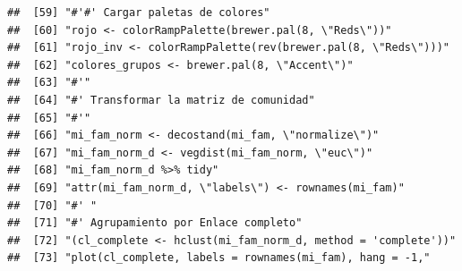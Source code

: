 \documentclass[11pt,]{article}
\begin{document}
\begin{verbatim}
##  [59] "#'#' Cargar paletas de colores"                                                                                                                                        
##  [60] "rojo <- colorRampPalette(brewer.pal(8, \"Reds\"))"                                                                                                                     
##  [61] "rojo_inv <- colorRampPalette(rev(brewer.pal(8, \"Reds\")))"                                                                                                            
##  [62] "colores_grupos <- brewer.pal(8, \"Accent\")"                                                                                                                           
##  [63] "#'"                                                                                                                                                                    
##  [64] "#' Transformar la matriz de comunidad"                                                                                                                                 
##  [65] "#'"                                                                                                                                                                    
##  [66] "mi_fam_norm <- decostand(mi_fam, \"normalize\")"                                                                                                                       
##  [67] "mi_fam_norm_d <- vegdist(mi_fam_norm, \"euc\")"                                                                                                                        
##  [68] "mi_fam_norm_d %>% tidy"                                                                                                                                                
##  [69] "attr(mi_fam_norm_d, \"labels\") <- rownames(mi_fam)"                                                                                                                   
##  [70] "#' "                                                                                                                                                                   
##  [71] "#' Agrupamiento por Enlace completo"                                                                                                                                   
##  [72] "(cl_complete <- hclust(mi_fam_norm_d, method = 'complete'))"                                                                                                           
##  [73] "plot(cl_complete, labels = rownames(mi_fam), hang = -1,"                                                                                                               

\end{verbatim}
\end{document}
